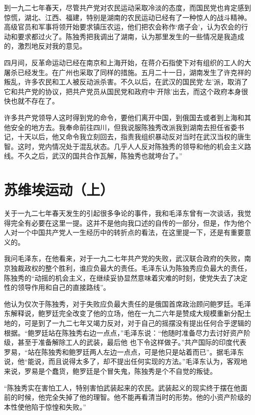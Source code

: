 \documentclass[10pt]{book}
\begin{document}
到一九二七年春天，尽管共产党对农民运动采取冷淡的态度，而国民党也肯定感到惊慌，湖北、江西、福建，特别是湖南的农民运动已经有了一种惊人的战斗精神。高级官员和军事将领开始要求镇压农运，他们把农会称作‘痞子会’，认为农会的行动和要求都过火了。陈独秀把我调出了湖南，认为那里发生的一些情况是我造成的，激烈地反对我的意见。

四月间，反革命运动已经在南京和上海开始，在蒋介石指使下对有组织的工人的大屠杀已经发生。在广州也采取了同样的措施。五月二十一日，湖南发生了许克祥的叛乱，许多农民和工人被反动派杀害。不久以后，在武汉的国民党‘左’派，取消了它和共产党的协议，把共产党员从国民党和政府中‘开除’出去，而这个政府本身很快也就不存在了。

许多共产党领导人这时得到党的命令，要他们离开中国，到俄国去或者到上海和其他安全的地方去。我奉命前往四川，但我说服陈独秀改派我到湖南去担任省委书记，十天以后，他又命令我立刻回去，指责我组织暴动反对当时在武汉当权的唐生智。这时，党内情况处于混乱状态。几乎人人反对陈独秀的领导和他的机会主义路线。不久之后，武汉的国共合作瓦解，陈独秀也就垮台了。”

\section{苏维埃运动（上）}

关于一九二七年春天发生的引起很多争论的事件，我和毛泽东曾有一次谈话，我觉得完全有必要在这里一提。这并不是他向我口述的自传的一部分，但是，作为他个人对一个中国共产党人一生经历中的转折点的看法，在这里提一下，还是有重要意义的。

我问毛泽东，在他看来，对于一九二七年共产党的失败，武汉联合政府的失败，南京独裁政权的整个胜利，谁应负最大的责任。毛泽东认为陈独秀应负最大的责任，陈独秀的“动摇的机会主义，在继续妥协显然意味着灾难的时刻，使党失去了决定性的领导作用和自己的直接路线”。

他认为仅次于陈独秀，对于失败应负最大责任的是俄国首席政治顾问鲍罗廷。毛泽东解释说，鲍罗廷完全改变了他的立场，他在一九二六年是赞成大规模重新分配土地的，可是到了一九二七年又竭力反对，对于自己的摇摆没有提出任何合乎逻辑的根据。“鲍罗廷站在陈独秀右边一点点，”毛泽东说：“他随时准备尽力去讨好资产阶级，甚至于准备解除工人的武装，最后他 也下令这样做子。”共产国际的印度代表罗易，“站在陈独秀和鲍罗廷两人左边一点点，可是他只是站着而已”。据毛泽东说，他“能说，而且说得太多了，却不提出任何实现的方法。”毛泽东认为，客观地来说，罗易是个蠢货，鲍罗廷是个冒失鬼，陈独秀是个不自觉的叛徒。

“陈独秀实在害怕工人，特别害怕武装起来的农民。武装起义的现实终于摆在他面前的时候，他完全失掉了他的理智。他不能再看清当时的形势。他的小资产阶级的本性使他陷于惊惶和失败。”
\end{document}
